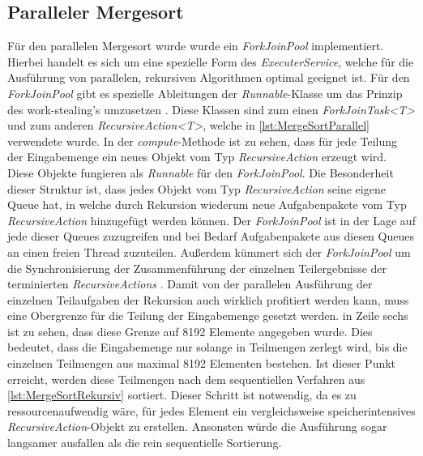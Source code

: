 \subsection{Paralleler Mergesort}

Für den parallelen Mergesort wurde wurde ein \emph{ForkJoinPool} implementiert. Hierbei handelt es sich um eine spezielle Form des \emph{ExecuterService}, welche für die Ausführung von parallelen, rekursiven Algorithmen optimal geeignet ist. Für den \emph{ForkJoinPool} gibt es spezielle Ableitungen der \emph{Runnable}-Klasse um das Prinzip des \glqq work-stealing's\grqq{} umzusetzen \cite{ForkJoinPoolOracle}. Diese Klassen sind zum einen \emph{ForkJoinTask<T>} und zum anderen \emph{RecursiveAction<T>}, welche in \autoref{lst:MergeSortParallel} verwendete wurde. In der \emph{compute}-Methode ist zu sehen, dass für jede Teilung der Eingabemenge ein neues Objekt vom Typ \emph{RecursiveAction} erzeugt wird. Diese Objekte fungieren als \emph{Runnable} für den \emph{ForkJoinPool}. Die Besonderheit dieser Struktur ist, dass jedes Objekt vom Typ \emph{RecursiveAction} seine eigene Queue hat, in welche durch Rekursion wiederum neue Aufgabenpakete vom Typ \emph{RecursiveAction} hinzugefügt werden können. Der \emph{ForkJoinPool} ist in der Lage auf jede dieser Queues zuzugreifen und bei Bedarf Aufgabenpakete aus diesen Queues an einen freien Thread zuzuteilen. Außerdem kümmert sich der \emph{ForkJoinPool} um die Synchronisierung der Zusammenführung der einzelnen Teilergebnisse der terminierten \emph{RecursiveActions} \cite{ForkJoinPoolExplained}. Damit von der parallelen Ausführung der einzelnen Teilaufgaben der Rekursion auch wirklich profitiert werden kann, muss eine Obergrenze für die Teilung der Eingabemenge gesetzt werden. in Zeile sechs ist zu sehen, dass diese Grenze auf 8192 Elemente angegeben wurde. Dies bedeutet, dass die Eingabemenge nur solange in Teilmengen zerlegt wird, bis die einzelnen Teilmengen aus maximal 8192 Elementen bestehen. Ist dieser Punkt erreicht, werden diese Teilmengen nach dem sequentiellen Verfahren aus \autoref{lst:MergeSortRekursiv} sortiert. Dieser Schritt ist notwendig, da es zu ressourcenaufwendig wäre, für jedes Element ein vergleichsweise speicherintensives \emph{RecursiveAction}-Objekt zu erstellen. Ansonsten würde die Ausführung sogar langsamer ausfallen als die rein sequentielle Sortierung.

